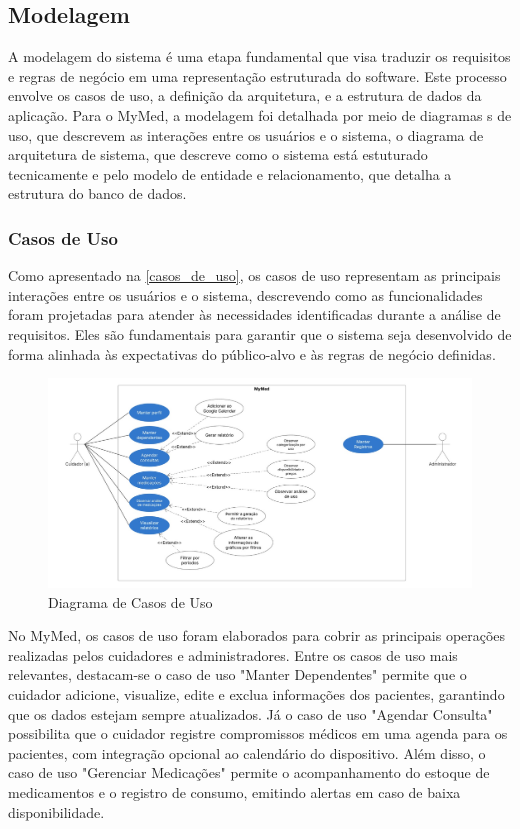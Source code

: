 \documentclass[
	article,			%
	12pt,				%
	oneside,			%
	a4paper,			%
    BIBLATEX,           %
	english,			%
	brazil,				%
	sumario=tradicional
	]{abntex2}
\newcommand\nomeprojeto{MyMed}
\begin{document}
\subsection{Modelagem}

A modelagem do sistema é uma etapa fundamental que visa traduzir os requisitos e regras de negócio em uma representação estruturada do software. Este processo envolve os casos de uso, a definição da arquitetura, e a estrutura de dados da aplicação. Para o \nomeprojeto, a modelagem foi detalhada por meio de diagramas s de uso, que descrevem as interações entre os usuários e o sistema, o diagrama de arquitetura de sistema, que descreve como o sistema está estuturado tecnicamente e pelo modelo de entidade e relacionamento, que detalha a estrutura do banco de dados.

\subsubsection{Casos de Uso}

Como apresentado na \autoref{casos_de_uso}, os casos de uso representam as principais interações entre os usuários e o sistema, descrevendo como as funcionalidades foram projetadas para atender às necessidades identificadas durante a análise de requisitos. Eles são fundamentais para garantir que o sistema seja desenvolvido de forma alinhada às expectativas do público-alvo e às regras de negócio definidas.

\begin{figure}[!htbp]
    \centering
    \includegraphics[width=1.0\linewidth]{Figuras/diagrama-casos-uso.jpg}
    \caption{Diagrama de Casos de Uso}
    \label{casos_de_uso}
\end{figure}


No \nomeprojeto, os casos de uso foram elaborados para cobrir as principais operações realizadas pelos cuidadores e administradores. Entre os casos de uso mais relevantes, destacam-se o caso de uso "Manter Dependentes" permite que o cuidador adicione, visualize, edite e exclua informações dos pacientes, garantindo que os dados estejam sempre atualizados. Já o caso de uso "Agendar Consulta" possibilita que o cuidador registre compromissos médicos em uma agenda para os pacientes, com integração opcional ao calendário do dispositivo. Além disso, o caso de uso "Gerenciar Medicações" permite o acompanhamento do estoque de medicamentos e o registro de consumo, emitindo alertas em caso de baixa disponibilidade.
\end{document}
